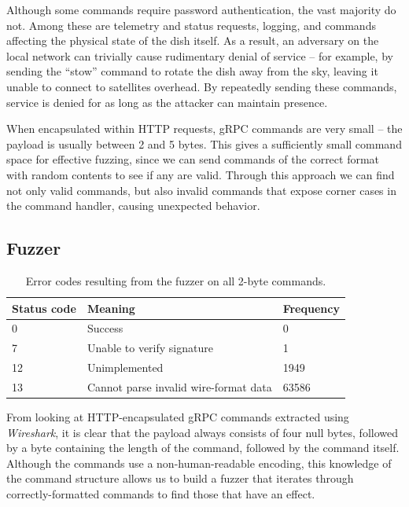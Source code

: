 Although some commands require password authentication, the vast majority do not.
Among these are telemetry and status requests, logging, and commands affecting the physical state of the dish itself.
As a result, an adversary on the local network can trivially cause rudimentary denial of service -- for example, by sending the ``stow'' command to rotate the dish away from the sky, leaving it unable to connect to satellites overhead.
By repeatedly sending these commands, service is denied for as long as the attacker can maintain presence.

When encapsulated within HTTP requests, gRPC commands are very small -- the payload is usually between 2 and 5 bytes.
This gives a sufficiently small command space for effective fuzzing, since we can send commands of the correct format with random contents to see if any are valid.
Through this approach we can find not only valid commands, but also invalid commands that expose corner cases in the command handler, causing unexpected behavior.


\subsection{Fuzzer}\label{sec:fuzzer}

\begin{table}
    \centering
    \begin{tabular}{lll}
        \toprule
        Status code & Meaning & Frequency \\
        \midrule
        0  & Success                               & 0     \\
        7  & Unable to verify signature            & 1     \\
        12 & Unimplemented                         & 1949  \\
        13 & Cannot parse invalid wire-format data & 63586 \\
        \bottomrule
    \end{tabular}
\caption{Error codes resulting from the fuzzer on all 2-byte commands.}
\label{tab:fuzzer-results}
\end{table}

From looking at HTTP-encapsulated gRPC commands extracted using \textit{Wireshark}, it is clear that the payload always consists of four null bytes, followed by a byte containing the length of the command, followed by the command itself.
Although the commands use a non-human-readable encoding, this knowledge of the command structure allows us to build a fuzzer that iterates through correctly-formatted commands to find those that have an effect.

